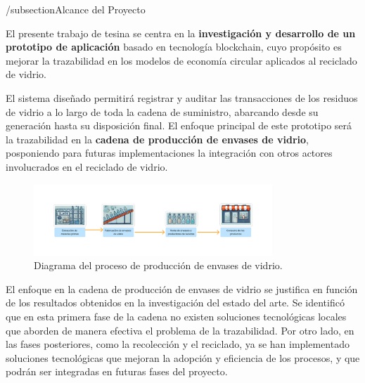 \documentclass[main.tex]{subfiles}
\begin{document}
/subsection{Alcance del Proyecto}

El presente trabajo de tesina se centra en la \textbf{investigación y desarrollo de un prototipo de aplicación} basado en tecnología blockchain, cuyo propósito es mejorar la trazabilidad en los modelos de economía circular aplicados al reciclado de vidrio. 

El sistema diseñado permitirá registrar y auditar las transacciones de los residuos de vidrio a lo largo de toda la cadena de suministro, abarcando desde su generación hasta su disposición final. El enfoque principal de este prototipo será la trazabilidad en la \textbf{cadena de producción de envases de vidrio}, posponiendo para futuras implementaciones la integración con otros actores involucrados en el reciclado de vidrio.

\begin{figure}[h]
    \centering
    \includegraphics[width=0.8\textwidth]{../assets/glass-production.png}
    \caption{Diagrama del proceso de producción de envases de vidrio.}
    \label{fig:glass_production}
\end{figure}

El enfoque en la cadena de producción de envases de vidrio se justifica en función de los resultados obtenidos en la investigación del estado del arte. Se identificó que en esta primera fase de la cadena no existen soluciones tecnológicas locales que aborden de manera efectiva el problema de la trazabilidad. Por otro lado, en las fases posteriores, como la recolección y el reciclado, ya se han implementado soluciones tecnológicas que mejoran la adopción y eficiencia de los procesos, y que podrán ser integradas en futuras fases del proyecto.


\end{document}
